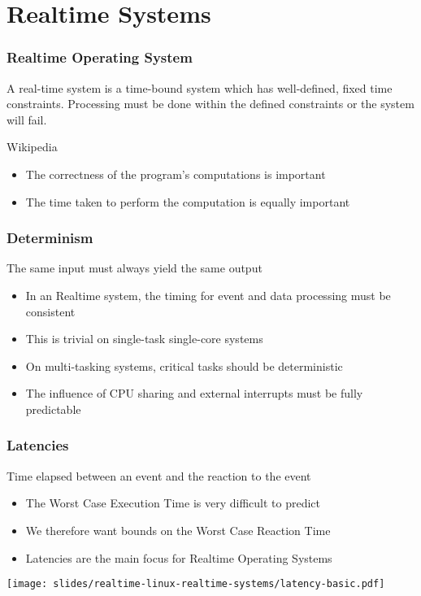 \section{Realtime Systems}

\begin{frame}
  \frametitle{Realtime Operating System}
   A real-time system is a time-bound system which has well-defined, fixed time constraints. Processing must be done within the defined constraints or the system will fail.

        \begin{center}\footnotesize{Wikipedia}\end{center}
                \begin{itemize}
                        \item The correctness of the program's computations is important
                        \item The time taken to perform the computation is equally important
                \end{itemize}
\end{frame}

\begin{frame}
  \frametitle{Determinism}
  The same input must always yield the same output
        \begin{itemize}
                \item In an Realtime system, the timing for event and data processing must be consistent
                \item This is trivial on single-task single-core systems
                \item On multi-tasking systems, critical tasks should be deterministic
                \item The influence of CPU sharing and external interrupts must be fully predictable
        \end{itemize}
\end{frame}

\begin{frame}
  \frametitle{Latencies}
  Time elapsed between an event and the reaction to the event
        \begin{itemize}
                \item The Worst Case Execution Time is very difficult to predict
                \item We therefore want bounds on the Worst Case Reaction Time
                \item Latencies are the main focus for Realtime Operating Systems
        \end{itemize}
        \begin{center}
                \texttt{[image: slides/realtime-linux-realtime-systems/latency-basic.pdf]}
        \end{center}
\end{frame}

